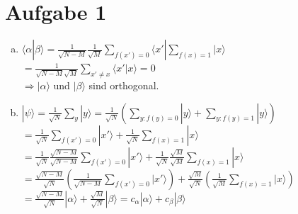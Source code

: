 \documentclass[a4paper]{scrartcl}
\begin{document}
\section*{Aufgabe 1}
\begin{enumerate}[a)]
\item $ \langle \alpha  | \beta \rangle  = \frac{1}{\sqrt{N-M}} \frac{1}{\sqrt{M}} \sum_{f(x')=0} \langle x' | \sum_{f(x)=1} | x \rangle$\\
$=\frac{1}{\sqrt{N-M} \sqrt{M}} \sum_{x'\neq x} \langle x' | x \rangle = 0$\\
$\Rightarrow |\alpha \rangle$ und $| \beta \rangle$ sind orthogonal.

\item $ | \psi \rangle = \frac{1}{\sqrt{N}} \sum_y |y\rangle = \frac{1}{\sqrt{N}} (\sum_{y: f(y) = 0} |y\rangle + \sum_{y: f(y) = 1} |y\rangle)$\\
$= \frac{1}{\sqrt{N}} \sum_{f(x') = 0} |x'\rangle + \frac{1}{\sqrt{N}} \sum_{f(x) = 1} |x\rangle$\\
$= \frac{1}{\sqrt{N}} \frac{\sqrt{N-M}}{\sqrt{N-M}} \sum_{f(x') = 0} |x'\rangle + \frac{1}{\sqrt{N}} \frac{\sqrt{M}}{\sqrt{M}} \sum_{f(x) = 1} |x\rangle$\\
$= \frac{\sqrt{N-M}}{\sqrt{N}} (\frac{1}{\sqrt{N-M}} \sum_{f(x') = 0} |x'\rangle) + \frac{\sqrt{M}}{\sqrt{N}} (\frac{1}{\sqrt{M}} \sum_{f(x) = 1} |x\rangle)$\\
$= \frac{\sqrt{N-M}}{\sqrt{N}} |\alpha \rangle + \frac{\sqrt{M}}{\sqrt{N}} |\beta \rangle = c_{\alpha} |\alpha \rangle + c_{\beta} |\beta \rangle$\\


\end{enumerate}
\end{document}
